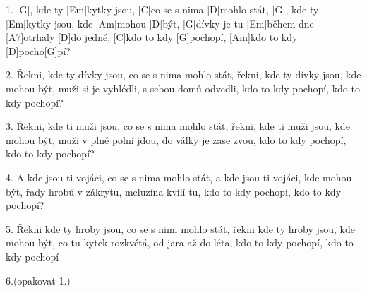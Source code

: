 
1. [G], kde ty [Em]kytky jsou, [C]co se s nima [D]mohlo stát,
[G], kde ty [Em]kytky jsou, kde [Am]mohou [D]být,
[G]dívky je tu [Em]během dne [A7]otrhaly [D]do jedné,
[C]kdo to kdy [G]pochopí, [Am]kdo to kdy [D]pocho[G]pí?

2. Řekni, kde ty dívky jsou, co se s nima mohlo stát,
řekni, kde ty dívky jsou, kde mohou být,
muži si je vyhlédli, s sebou domů odvedli,
kdo to kdy pochopí, kdo to kdy pochopí?

3. Řekni, kde ti muži jsou, co se s nima mohlo stát,
řekni, kde ti muži jsou, kde mohou být,
muži v plné polní jdou, do války je zase zvou,
kdo to kdy pochopí, kdo to kdy pochopí?

4. A kde jsou ti vojáci, co se s nima mohlo stát,
a kde jsou ti vojáci, kde mohou být,
řady hrobů v zákrytu, meluzína kvílí tu,
kdo to kdy pochopí, kdo to kdy pochopí?

5. Řekni kde ty hroby jsou, co se s nimi mohlo stát,
řekni kde ty hroby jsou, kde mohou být,
co tu kytek rozkvétá, od jara až do léta,
kdo to kdy pochopí, kdo to kdy pochopí


6.(opakovat 1.)